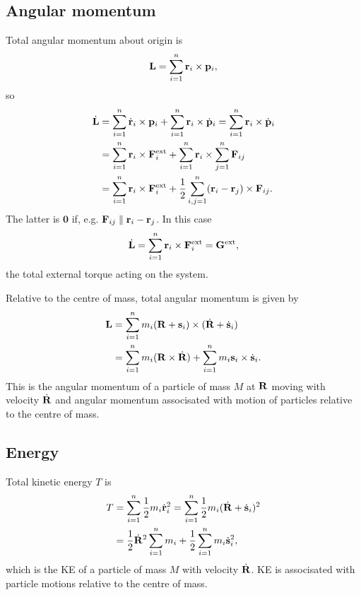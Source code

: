 \subsection{Angular momentum}
Total angular momentum about origin is 
\[
    {\bf L} = \sum_{i=1}^{n} {\bf r}_i \times {\bf p}_i,
\]
so
\begin{align*}
    \dot{{\bf L}} &= \sum_{i=1}^{n}\dot{{\bf r}}_i \times {\bf p}_i + \sum_{i=1}^{n} {\bf r}_i \times \dot{{\bf p}}_i = \sum_{i=1}^{n} {\bf r}_i \times \dot{{\bf p}}_i\\ 
    &= \sum_{i=1}^{n}\mathbf{r}_i \times {\bf F}_i^{\text{ext}}+\sum_{i=1}^{n}\mathbf{r}_i \times \sum_{j=1}^{n}{\bf F}_{ij}\\ 
    &= \sum_{i=1}^{n}\mathbf{r}_i \times {\bf F}_i^{\text{ext}}+\frac{1}{2}\sum_{i,j=1}^{n} ({\bf r}_i-{\bf r}_j)\times {\bf F}_{ij}.
\end{align*}
The latter is $\mathbf{0}$ if, e.g. $ {\bf F}_{ij}\parallel {\bf r}_i-{\bf r}_j $. In this case 
\[
    \dot{{\bf L}} = \sum_{i=1}^{n}\mathbf{r}_i \times {\bf F}_i^{\text{ext}} = {\bf G}^{\text{ext}},
\]
the total external torque acting on the system.

Relative to the centre of mass, total angular momentum is given by 
\begin{align*}
    {\bf L} &= \sum_{i=1}^{n} m_i({\bf R}+{\bf s}_i) \times (\dot{{\bf R}}+\dot{{\bf s}}_i)\\ 
    &= \sum_{i=1}^{n}m_i ({\bf R} \times \dot{{\bf R}})+\sum_{i=1}^{n}m_i {\bf s}_i \times \dot{{\bf s}}_i.
\end{align*}
This is the angular momentum of a particle of mass $M$ at $ {\bf R} $ moving with velocity $ \dot{{\bf R}} $ and angular momentum associsated with motion of particles relative to the centre of mass.

\subsection{Energy}
Total kinetic energy $T$ is 
\begin{align*}
    T &= \sum_{i=1}^{n}\frac{1}{2}m_i \dot{{\bf r}}_i^2 = \sum_{i=1}^{n} \frac{1}{2}m_i (\dot{{\bf R}}+\dot{{\bf s}}_i)^2\\ 
    &= \frac{1}{2} \dot{{\bf R}}^2 \sum_{i=1}^{n}m_i+\frac{1}{2}\sum_{i=1}^{n}m_i \dot{{\bf s}}_i^2,
\end{align*}
which is the KE of a particle of mass $M$ with velocity $ \dot{{\bf R}} $. KE is associsated with particle motions relative to the centre of mass.

